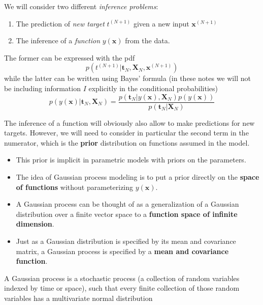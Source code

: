 \documentclass[%
oneside,                 %
final,                   %
10pt]{article}
\newenvironment{notice_mdfboxadmon}[1][]{
\begin{notice_mdfboxmdframed}[frametitle=#1]
}
{
\end{notice_mdfboxmdframed}
}
\begin{document}
\noindent
We will consider two different \emph{inference problems}:

\begin{enumerate}
\item The prediction of \emph{new target} $t^{(N+1)}$ given a new input $\boldsymbol{x}^{(N+1)}$

\item The inference of a \emph{function} $y(\boldsymbol{x})$ from the data.
\end{enumerate}

\noindent
The former can be expressed with the pdf
\[ 
p\left( t^{(N+1)} | \boldsymbol{t}_N, \boldsymbol{X}_{N}, \boldsymbol{x}^{(N+1)} \right)
\]
while the latter can be written using Bayes' formula (in these notes we will not be including information $I$ explicitly in the conditional probabilities)
\[ p\left( y(\boldsymbol{x}) | \boldsymbol{t}_N, \boldsymbol{X}_N \right)
= \frac{p\left( \boldsymbol{t}_N | y(\boldsymbol{x}), \boldsymbol{X}_N \right) p \left( y(\boldsymbol{x}) \right) }
{p\left( \boldsymbol{t}_N | \boldsymbol{X}_N \right) } \]

The inference of a function will obviously also allow to make predictions for new targets. 
However, we will need to consider in particular the second term in the numerator, which is the \textbf{prior} distribution on functions assumed in the model.

\begin{itemize}
\item This prior is implicit in parametric models with priors on the parameters.

\item The idea of Gaussian process modeling is to put a prior directly on the \textbf{space of functions} without parameterizing $y(\boldsymbol{x})$.

\item A Gaussian process can be thought of as a generalization of a Gaussian distribution over a finite vector space to a \textbf{function space of infinite dimension}.

\item Just as a Gaussian distribution is specified by its mean and covariance matrix, a Gaussian process is specified by a \textbf{mean and covariance function}.
\end{itemize}

\noindent

\begin{notice_mdfboxadmon}
A Gaussian process is a stochastic process (a collection of random variables indexed by time or space), such that every finite collection of those random variables has a multivariate normal distribution
\end{notice_mdfboxadmon} %
\end{document}
